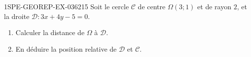 \begin{exercice}{1SPE-GEOREP-EX-036}{2}{15}
Soit le cercle $\mathcal{C}$ de centre $\Omega(3 ; 1)$ et de rayon $2$, et la droite $\mathcal{D} : 3x + 4y - 5 = 0$.
\begin{enumerate}
  \item Calculer la distance de $\Omega$ à $\mathcal{D}$.
  \item En déduire la position relative de $\mathcal{D}$ et $\mathcal{C}$.
\end{enumerate}
\end{exercice}
